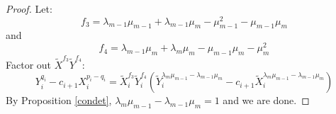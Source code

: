 \documentclass[10pt,a4paper]{amsart}
\begin{document}
\begin{proof}
Let:
\begin{equation*}
f_3=\lambda_{m-1}\mu_{m-1}+\lambda_{m-1}\mu_m-\mu_{m-1}^2-\mu_{m-1}\mu_m
\end{equation*}
and
\begin{equation*}
f_4=\lambda_{m-1}\mu_m+\lambda_m\mu_m-\mu_{m-1}\mu_m-\mu_m^2
\end{equation*}
Factor out $\tilde X^{f_3}\tilde Y^{f_4}$:
\begin{equation*}
Y_{i}^{q_i} - c_{i+1}X_{i}^{p_i-q_i} = \tilde X_i^{f_3} \tilde Y_i^{f_4}\left(\tilde Y_i^{\lambda_m \mu_{m-1} - \lambda_{m-1} \mu_m} - c_{i+1}\tilde X_i^{\lambda_m\mu_{m-1}-\lambda_{m-1}\mu_m}\right)
\end{equation*}
By Proposition \ref{condet}, $\lambda_m\mu_{m-1}-\lambda_{m-1}\mu_m=1$ and we are done.
\end{proof}
\end{document}
